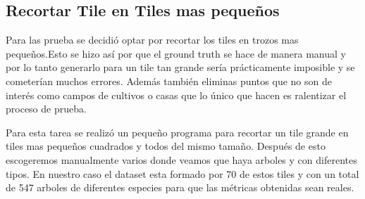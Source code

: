 \subsection{Recortar Tile en Tiles mas pequeños}
Para las prueba se decidió optar por recortar los tiles en trozos mas pequeños.Esto se hizo así por que el ground truth se hace de manera manual y por lo tanto generarlo para un tile tan grande sería prácticamente imposible y se cometerían muchos errores. Además también eliminas puntos que no son de interés como campos de cultivos o casas que lo único que hacen es ralentizar el proceso de prueba.

Para esta tarea se realizó un pequeño programa para recortar un tile grande en tiles mas pequeños cuadrados y todos del mismo tamaño. Después de esto escogeremos manualmente varios donde veamos que haya arboles y con diferentes tipos. En nuestro caso el dataset esta formado por 70 de estos tiles y con un total de 547 arboles de diferentes especies para que las métricas obtenidas sean reales.


